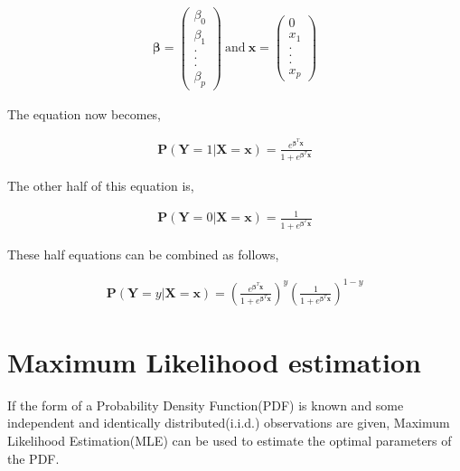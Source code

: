 \documentclass[11pt, a4paper]{article}
\begin{document}
\begin{align*}
	\boldsymbol{\beta} = \begin{pmatrix} \beta_0 \\ \beta_1 \\ . \\ . \\ .  \\ \beta_p \end{pmatrix} \ \text{and}\ 
	\boldsymbol{x} = \begin{pmatrix} 0           \\ x_1 \\ . \\ . \\ .  \\ x_p \end{pmatrix}
\end{align*}

The equation now becomes,

\begin{align*}
	\mathbf{P}(\mathbf{Y}=1|\mathbf{X} = \boldsymbol{x}) = \frac{e^{\boldsymbol{\beta}^T\boldsymbol{x}}}{1 + e^{\boldsymbol{\beta}^T\boldsymbol{x}}} 
\end{align*}

The other half of this equation is,

\begin{align*}
	\mathbf{P}(\mathbf{Y}=0|\mathbf{X} = \boldsymbol{x}) = \frac{1}{1 + e^{\boldsymbol{\beta}^T\boldsymbol{x}}} 
\end{align*}


These half equations can be combined as follows,

\begin{align*}
	\mathbf{P}(\mathbf{Y}=y|\mathbf{X} = \boldsymbol{x}) = \left(\frac{e^{\boldsymbol{\beta}^T\boldsymbol{x}}}{1 + e^{\boldsymbol{\beta}^T\boldsymbol{x}}}\right) ^y \left(\frac{1}{1 + e^{\boldsymbol{\beta}^T\boldsymbol{x}}}\right)^{1-y} 
\end{align*}

\section{Maximum Likelihood estimation}

If the form of a Probability Density Function(PDF) is known and some independent and identically distributed(i.i.d.) observations are given, Maximum Likelihood Estimation(MLE) can be used to estimate the optimal parameters of the PDF.
\end{document}
